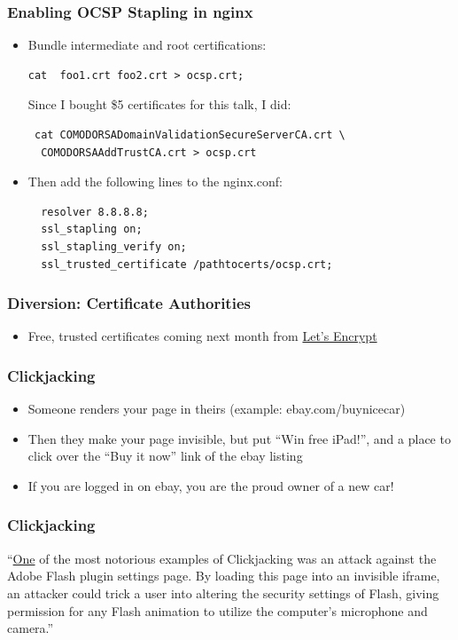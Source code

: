 \documentclass[9pt]{beamer}
\begin{document}
\begin{frame}[fragile]
\frametitle{Enabling OCSP Stapling in nginx}
\begin{itemize}
\item Bundle intermediate and root certifications:
\begin{verbatim}
cat  foo1.crt foo2.crt > ocsp.crt;
\end{verbatim}
Since I bought \$5 certificates for this talk, I did:
\begin{verbatim}
 cat COMODORSADomainValidationSecureServerCA.crt \
  COMODORSAAddTrustCA.crt > ocsp.crt
\end{verbatim}
\pause
\item Then add the following lines to the nginx.conf:
\begin{verbatim}
  resolver 8.8.8.8;
  ssl_stapling on;
  ssl_stapling_verify on;
  ssl_trusted_certificate /pathtocerts/ocsp.crt;
\end{verbatim}
\end{itemize}
\end{frame}

\begin{frame}[fragile]
\frametitle{Diversion: Certificate Authorities}
\begin{itemize}
\item Free, trusted certificates coming next month from \href{https://letsencrypt.org/}{Let's Encrypt}
\end{itemize}
\end{frame}

\begin{frame}[fragile]
\frametitle{Clickjacking}
\begin{itemize}
\item Someone renders your page in theirs (example: ebay.com/buynicecar)
\pause
\item Then they make your page invisible, but put ``Win free iPad!'', and a place to click over the ``Buy it now'' link of the ebay listing
\pause
\item If you are logged in on ebay, you are the proud owner of a new car!
\end{itemize}
\end{frame}

\begin{frame}[fragile]
\frametitle{Clickjacking}
``\href{https://www.owasp.org/index.php/Clickjacking}{One} of the most notorious examples of Clickjacking was an attack against the Adobe Flash plugin settings page. By loading this page into an invisible iframe, an attacker could trick a user into altering the security settings of Flash, giving permission for any Flash animation to utilize the computer's microphone and camera.''
\end{frame}
\end{document}

